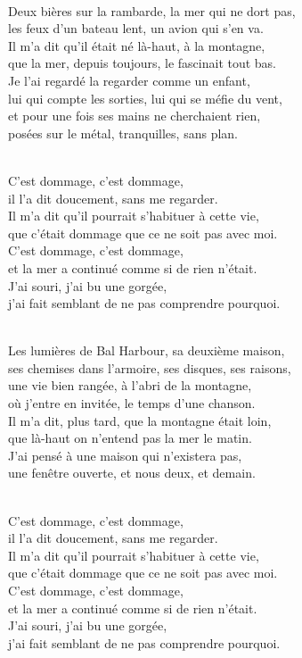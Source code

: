 \begin{lyrics}

\\
Deux bières sur la rambarde, la mer qui ne dort pas,\\
les feux d'un bateau lent, un avion qui s'en va.\\
Il m'a dit qu'il était né là-haut, à la montagne,\\
que la mer, depuis toujours, le fascinait tout bas.\\
Je l'ai regardé la regarder comme un enfant,\\
lui qui compte les sorties, lui qui se méfie du vent,\\
et pour une fois ses mains ne cherchaient rien,\\
posées sur le métal, tranquilles, sans plan.

\\
C'est dommage, c'est dommage,\\
il l'a dit doucement, sans me regarder.\\
Il m'a dit qu'il pourrait s'habituer à cette vie,\\
que c'était dommage que ce ne soit pas avec moi.\\
C'est dommage, c'est dommage,\\
et la mer a continué comme si de rien n'était.\\
J'ai souri, j'ai bu une gorgée,\\
j'ai fait semblant de ne pas comprendre pourquoi.

\\
Les lumières de Bal Harbour, sa deuxième maison,\\
ses chemises dans l'armoire, ses disques, ses raisons,\\
une vie bien rangée, à l'abri de la montagne,\\
où j'entre en invitée, le temps d'une chanson.\\
Il m'a dit, plus tard, que la montagne était loin,\\
que là-haut on n'entend pas la mer le matin.\\
J'ai pensé à une maison qui n'existera pas,\\
une fenêtre ouverte, et nous deux, et demain.

\\
C'est dommage, c'est dommage,\\
il l'a dit doucement, sans me regarder.\\
Il m'a dit qu'il pourrait s'habituer à cette vie,\\
que c'était dommage que ce ne soit pas avec moi.\\
C'est dommage, c'est dommage,\\
et la mer a continué comme si de rien n'était.\\
J'ai souri, j'ai bu une gorgée,\\
j'ai fait semblant de ne pas comprendre pourquoi.


\end{lyrics}
